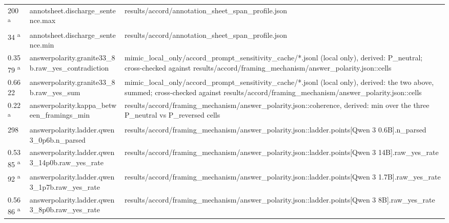 \begin{longtable}{@{}p{0.7in}p{1.9in}p{2.6in}@{}}
200 \textsuperscript{a} & annotsheet.\allowbreak{}discharge\_sentence.\allowbreak{}max & results/\allowbreak{}accord/\allowbreak{}annotation\_sheet\_span\_profile.\allowbreak{}json\\
34 \textsuperscript{a} & annotsheet.\allowbreak{}discharge\_sentence.\allowbreak{}min & results/\allowbreak{}accord/\allowbreak{}annotation\_sheet\_span\_profile.\allowbreak{}json\\
0.3579 \textsuperscript{a} & answerpolarity.\allowbreak{}granite33\_8b.\allowbreak{}raw\_yes\_contradiction & mimic\_local\_only/\allowbreak{}accord\_prompt\_sensitivity\_cache/\allowbreak{}*.\allowbreak{}jsonl (local only), derived: P\_neutral; cross-checked against results/\allowbreak{}accord/\allowbreak{}framing\_mechanism/\allowbreak{}answer\_polarity.\allowbreak{}json::cells\\
0.6622 & answerpolarity.\allowbreak{}granite33\_8b.\allowbreak{}raw\_yes\_sum & mimic\_local\_only/\allowbreak{}accord\_prompt\_sensitivity\_cache/\allowbreak{}*.\allowbreak{}jsonl (local only), derived: the two above, summed; cross-checked against results/\allowbreak{}accord/\allowbreak{}framing\_mechanism/\allowbreak{}answer\_polarity.\allowbreak{}json::cells\\
0.22 \textsuperscript{a} & answerpolarity.\allowbreak{}kappa\_between\_framings\_min & results/\allowbreak{}accord/\allowbreak{}framing\_mechanism/\allowbreak{}answer\_polarity.\allowbreak{}json::coherence, derived: min over the three P\_neutral vs P\_reversed cells\\
298 & answerpolarity.\allowbreak{}ladder.\allowbreak{}qwen3\_0p6b.\allowbreak{}n\_parsed & results/\allowbreak{}accord/\allowbreak{}framing\_mechanism/\allowbreak{}answer\_polarity.\allowbreak{}json::ladder.\allowbreak{}points[Qwen 3 0.\allowbreak{}6B].\allowbreak{}n\_parsed\\
0.5385 \textsuperscript{a} & answerpolarity.\allowbreak{}ladder.\allowbreak{}qwen3\_14p0b.\allowbreak{}raw\_yes\_rate & results/\allowbreak{}accord/\allowbreak{}framing\_mechanism/\allowbreak{}answer\_polarity.\allowbreak{}json::ladder.\allowbreak{}points[Qwen 3 14B].\allowbreak{}raw\_yes\_rate\\
92 \textsuperscript{a} & answerpolarity.\allowbreak{}ladder.\allowbreak{}qwen3\_1p7b.\allowbreak{}raw\_yes\_rate & results/\allowbreak{}accord/\allowbreak{}framing\_mechanism/\allowbreak{}answer\_polarity.\allowbreak{}json::ladder.\allowbreak{}points[Qwen 3 1.\allowbreak{}7B].\allowbreak{}raw\_yes\_rate\\
0.5686 \textsuperscript{a} & answerpolarity.\allowbreak{}ladder.\allowbreak{}qwen3\_8p0b.\allowbreak{}raw\_yes\_rate & results/\allowbreak{}accord/\allowbreak{}framing\_mechanism/\allowbreak{}answer\_polarity.\allowbreak{}json::ladder.\allowbreak{}points[Qwen 3 8B].\allowbreak{}raw\_yes\_rate\\

\end{longtable}
